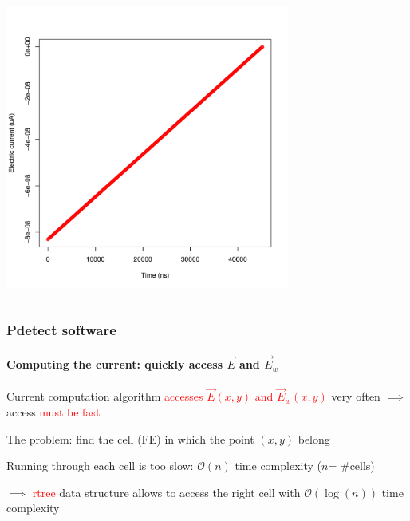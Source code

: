 \documentclass[14pt]{beamer}
\begin{document}
\begin{frame}
\begin{columns}
\begin{column}{0.5\textwidth}
       \includegraphics[width=0.7\textwidth]{images/helium2_precise.pdf}
    \end{column}

  \end{columns}
\end{frame}

\begin{frame}
  \frametitle{Pdetect software}
  \framesubtitle{Computing the current: quickly access $\vec{E}$ and $\vec{E}_w$}

Current computation algorithm \textcolor{red}{accesses $\vec{E}(x,y)$ and $\vec{E}_w(x,y)$} very
often $\implies$ access \textcolor{red}{must be fast}
\newline

The problem: find the cell (FE) in which the point $(x,y)$ belong
\newline

Running through each cell is too slow: $\mathcal{O}(n)$ time complexity ($n$= $\#$cells)
\newline

$\implies$ \textcolor{red}{rtree} data structure allows to access the right
cell with $\mathcal{O}(\log(n))$ time complexity

\end{frame}
\end{document}
